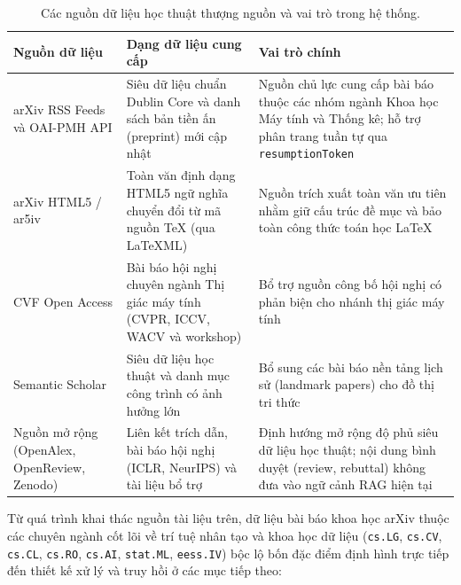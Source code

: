 \begin{table}[htbp]
    \centering
    \caption{Các nguồn dữ liệu học thuật thượng nguồn và vai trò trong hệ thống.}
    \label{tab:nguon-du-lieu-thuong-nguon}
    \small
    \begin{tabularx}{\textwidth}{@{}>{\raggedright\arraybackslash}p{3.8cm}>{\raggedright\arraybackslash}p{4.8cm}>{\raggedright\arraybackslash}X@{}}
        \toprule
        \textbf{Nguồn dữ liệu} & \textbf{Dạng dữ liệu cung cấp} & \textbf{Vai trò chính} \\
        \midrule
        arXiv RSS Feeds và OAI-PMH API & Siêu dữ liệu chuẩn Dublin Core và danh sách bản tiền ấn (preprint) mới cập nhật & Nguồn chủ lực cung cấp bài báo thuộc các nhóm ngành Khoa học Máy tính và Thống kê; hỗ trợ phân trang tuần tự qua \texttt{resumptionToken} \\
        arXiv HTML5 / ar5iv & Toàn văn định dạng HTML5 ngữ nghĩa chuyển đổi từ mã nguồn TeX (qua LaTeXML) & Nguồn trích xuất toàn văn ưu tiên nhằm giữ cấu trúc đề mục và bảo toàn công thức toán học LaTeX \\
        CVF Open Access & Bài báo hội nghị chuyên ngành Thị giác máy tính (CVPR, ICCV, WACV và workshop) & Bổ trợ nguồn công bố hội nghị có phản biện cho nhánh thị giác máy tính \\
        Semantic Scholar & Siêu dữ liệu học thuật và danh mục công trình có ảnh hưởng lớn & Bổ sung các bài báo nền tảng lịch sử (landmark papers) cho đồ thị tri thức \\
        Nguồn mở rộng (OpenAlex, OpenReview, Zenodo) & Liên kết trích dẫn, bài báo hội nghị (ICLR, NeurIPS) và tài liệu bổ trợ & Định hướng mở rộng độ phủ siêu dữ liệu học thuật; nội dung bình duyệt (review, rebuttal) không đưa vào ngữ cảnh RAG hiện tại \\
        \bottomrule
    \end{tabularx}
\end{table}

Từ quá trình khai thác nguồn tài liệu trên, dữ liệu bài báo khoa học arXiv thuộc các chuyên ngành cốt lõi về trí tuệ nhân tạo và khoa học dữ liệu (\texttt{cs.LG}, \texttt{cs.CV}, \texttt{cs.CL}, \texttt{cs.RO}, \texttt{cs.AI}, \texttt{stat.ML}, \texttt{eess.IV}) bộc lộ bốn đặc điểm định hình trực tiếp đến thiết kế xử lý và truy hồi ở các mục tiếp theo:

